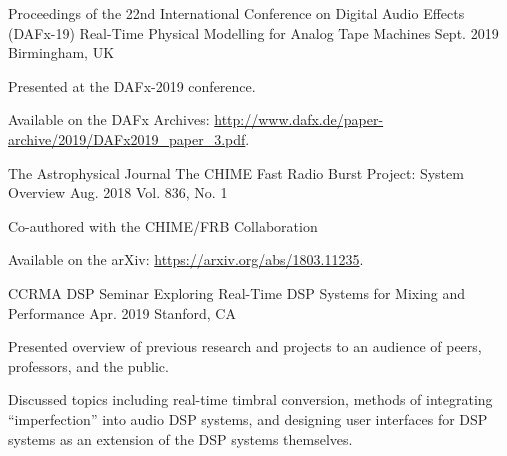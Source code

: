 

\begin{cventries}

  \cventry
    {Proceedings of the 22nd International Conference on Digital Audio Effects (DAFx-19)} %
    {Real-Time Physical Modelling for Analog Tape Machines} %
    {Sept. 2019} %
    {Birmingham, UK} %
    {
      \begin{cvitems} %
        \item {Presented at the DAFx-2019 conference.}
        \item {Available on the DAFx Archives: \url{http://www.dafx.de/paper-archive/2019/DAFx2019_paper_3.pdf}.}
      \end{cvitems}
    }

    \cventry
    {The Astrophysical Journal} %
    {The CHIME Fast Radio Burst Project: System Overview} %
    {Aug. 2018} %
    {Vol. 836, No. 1} %
    {
      \begin{cvitems} %
        \item {Co-authored with the CHIME/FRB Collaboration}
        \item {Available on the arXiv: \url{https://arxiv.org/abs/1803.11235}.}
      \end{cvitems}
    }

    \cventry
    {CCRMA DSP Seminar} %
    {Exploring Real-Time DSP Systems for Mixing and Performance} %
    {Apr. 2019} %
    {Stanford, CA} %
    {
      \begin{cvitems} %
        \item {Presented overview of previous research and projects to an audience of peers, professors, and the public.}
        \item {Discussed topics including real-time timbral conversion, methods of integrating ``imperfection'' into audio
               DSP systems, and designing user interfaces for DSP systems as an extension of the DSP systems themselves.}
      \end{cvitems}
    }


\end{cventries}
